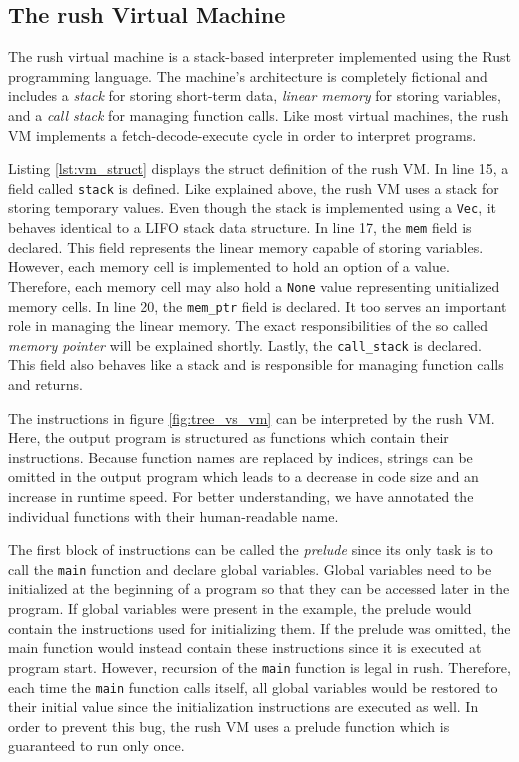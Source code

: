 \subsection{The rush Virtual Machine}

The rush virtual machine is a stack-based interpreter implemented using the Rust programming language.
The machine's architecture is completely fictional and includes a \emph{stack} for storing short-term data, \emph{linear memory} for storing variables, and a \emph{call stack} for managing function calls.
Like most virtual machines, the rush VM implements a fetch-decode-execute cycle in order to interpret programs.


Listing \ref{lst:vm_struct} displays the struct definition of the rush VM.
In line 15, a field called \texttt{stack} is defined.
Like explained above, the rush VM uses a stack for storing temporary values.
Even though the stack is implemented using a \texttt{Vec}, it behaves identical to a LIFO stack data structure.
In line 17, the \texttt{mem} field is declared.
This field represents the linear memory capable of storing variables.
However, each memory cell is implemented to hold an option of a value.
Therefore, each memory cell may also hold a \texttt{None} value representing unitialized memory cells.
In line 20, the \texttt{mem\_ptr} field is declared.
It too serves an important role in managing the linear memory.
The exact responsibilities of the so called \emph{memory pointer} will be explained shortly.
Lastly, the \texttt{call\_stack} is declared.
This field also behaves like a stack and is responsible for managing function calls and returns.

The instructions in figure \ref{fig:tree_vs_vm} can be interpreted by the rush VM.
Here, the output program is structured as functions which contain their instructions.
Because function names are replaced by indices, strings can be omitted in the output program which leads to a decrease in code size and an increase in runtime speed.
For better understanding, we have annotated the individual functions with their human-readable name.

The first block of instructions can be called the \emph{prelude} since its only task is to call the \texttt{main} function and declare global variables.
Global variables need to be initialized at the beginning of a program so that they can be accessed later in the program.
If global variables were present in the example, the prelude would contain the instructions used for initializing them.
If the prelude was omitted, the main function would instead contain these instructions since it is executed at program start.
However, recursion of the \texttt{main} function is legal in rush.
Therefore, each time the \texttt{main} function calls itself,
all global variables would be restored to their initial value since the initialization instructions are executed as well.
In order to prevent this bug, the rush VM uses a prelude function which is guaranteed to run only once.

